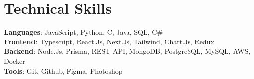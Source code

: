 \section{Technical Skills}
 \begin{itemize}[leftmargin=0.15in, label={}]
    \small{\item{
     \textbf{Languages}{: JavaScript, Python, C, Java, SQL, C\#} \\
     \textbf{Frontend}{: Typescript, React.Js, Next.Js, Tailwind, Chart.Js, Redux} \\
     \textbf{Backend}{: Node.Js, Prisma, REST API, MongoDB, PostgreSQL, MySQL, AWS, Docker} \\
     \textbf{Tools}{: Git, Github, Figma, Photoshop} \\
    }}
 \end{itemize}
 \vspace{-14pt}